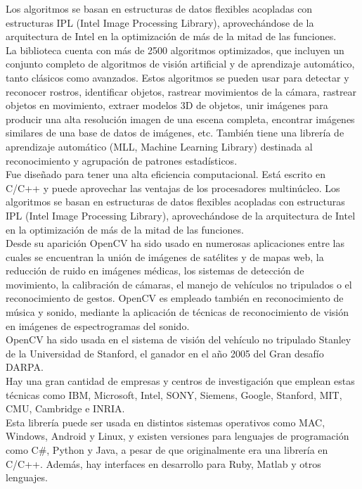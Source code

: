Los algoritmos se basan en estructuras de datos flexibles acopladas con estructuras IPL (Intel Image Processing Library), aprovechándose de la arquitectura de Intel en la optimización de más de la mitad de las funciones. \\

La biblioteca cuenta con más de 2500 algoritmos optimizados, que incluyen un conjunto completo de algoritmos de visión artificial y de aprendizaje automático, tanto clásicos como avanzados. Estos algoritmos se pueden usar para detectar y reconocer rostros, identificar objetos, rastrear movimientos de la cámara, rastrear objetos en movimiento, extraer modelos 3D de objetos, unir imágenes para producir una alta resolución imagen de una escena completa, encontrar imágenes similares de una base de datos de imágenes, etc. También tiene una librería de aprendizaje automático (MLL, Machine Learning Library) destinada al reconocimiento y agrupación de patrones estadísticos. \\

Fue diseñado para tener una alta eficiencia computacional. Está escrito en C/C++ y puede aprovechar las ventajas de los procesadores multinúcleo. Los algoritmos se basan en estructuras de datos flexibles acopladas con estructuras IPL (Intel Image Processing Library), aprovechándose de la arquitectura de Intel en la optimización de más de la mitad de las funciones. \\

Desde su aparición OpenCV ha sido usado en numerosas aplicaciones entre las cuales se encuentran la unión de imágenes de satélites y de mapas web, la reducción de ruido en imágenes médicas, los sistemas de detección de movimiento, la calibración de cámaras, el manejo de vehículos no tripulados o el reconocimiento de gestos. OpenCV es empleado también en reconocimiento de música y sonido, mediante la aplicación de técnicas de reconocimiento de visión en imágenes de espectrogramas del sonido.\\

OpenCV ha sido usada en el sistema de visión del vehículo no tripulado Stanley de la Universidad de Stanford, el ganador en el año 2005 del Gran desafío DARPA. \\

Hay una gran cantidad de empresas y centros de investigación que emplean estas técnicas como IBM, Microsoft, Intel, SONY, Siemens, Google, Stanford, MIT, CMU, Cambridge e INRIA.\\

Esta librería puede ser usada en distintos sistemas operativos como MAC, Windows, Android y Linux, y existen versiones para lenguajes de programación como C\#, Python y Java, a pesar de que originalmente era una librería en C/C++. Además, hay interfaces en desarrollo para Ruby, Matlab y otros lenguajes.\\

